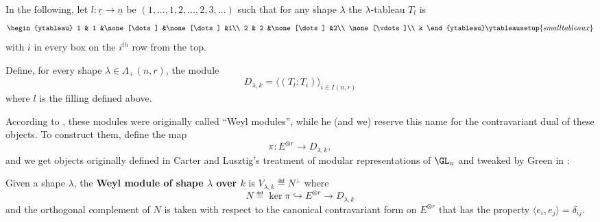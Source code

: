 \documentclass[12pt]{article}
\begin{document}
In the following, let $l:\underline r\to\underline n$ be $(1,\dots,1,2,\dots,2,3,\dots)$ such that for any shape $\lambda$ the 
$\lambda$-tableau $T_l$ is 
\[\begin{ytableau}
	1 & 1 &\none[\dots] &\none[\dots] &1\\
	2 & 2 &\none[\dots] &2\\
	\none[\vdots]\\
	k
\end{ytableau}\ytableausetup{smalltableaux}\]
with $i$ in every box on the $i^{th}$ row from the top.

\begin{defn}
	Define, for every shape $\lambda\in\Lambda_+(n,r)$, the module
	\[D_{\lambda,k}=\langle(T_l:T_i)\rangle_{i\in I(n,r)}\]
	where $l$ is the filling defined above.
\end{defn}
According to \cite{green}, these modules were originally called ``Weyl modules'', while he (and we)
reserve this name for the contravariant dual of these objects. To construct them, define the map 
\begin{equation}\label{eqn:pimap}
	\pi:E^{\otimes r}\to D_{\lambda, k},
\end{equation}
and we get objects originally defined in Carter and Lusztig's treatment of modular representations of $\GL_n$ \cite{carter-lusztig}
and tweaked by Green in \cite{green}:
\begin{defn}
	Given a shape $\lambda$, the \textbf{Weyl module of shape $\lambda$ over $k$} is 
	$V_{\lambda, k}\eqdef N^\perp$ where 
	\[N\eqdef\ker\pi\hookrightarrow E^{\otimes r}\to D_{\lambda,k}\]
	and the orthogonal complement of $N$ is taken with respect to the canonical contravariant form on $E^{\otimes r}$ that has the property $\langle e_i,e_j\rangle=\delta_{ij}$.
\end{defn}
\end{document}
